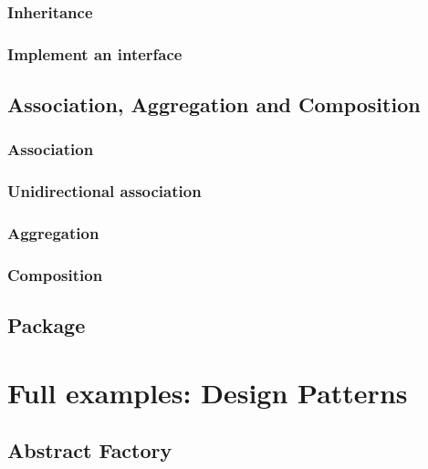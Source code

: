 \documentclass{article}
\newcommand{\demo}[2][1]{
\begin{minipage}{.49\linewidth}
\centering
\resizebox{#1\linewidth}{!}{

}
\end{minipage}
\hspace{0.01\linewidth}
\begin{minipage}{.5\linewidth}

\end{minipage}
}
\newcommand{\example}[1]{
\resizebox{\linewidth}{!}{

}

}
\begin{document}
\subsubsection{Inheritance}
\demo{inheritance}
 
\subsubsection{Implement an interface}
\demo{implement-interface}

\subsection{Association, Aggregation and Composition}
\subsubsection{Association} 
\demo{association}
 
\subsubsection{Unidirectional association}
\demo{unidirectional-association}

\subsubsection{Aggregation}
\demo{aggregation}

\subsubsection{Composition}
\demo{composition}

\subsection{Package}
\demo{package}

\section{Full examples: Design Patterns}
\subsection{Abstract Factory}
\example{abstract-factory}
\end{document}
